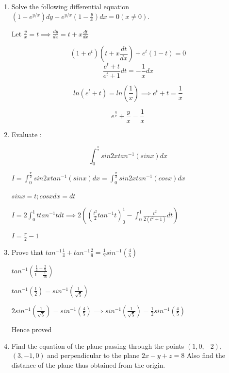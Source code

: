 \begin{enumerate}[label=\thesubsection.\arabic*, ref=\thesubsection.\theenumi]
mean $\mu= E(x) =\Sigma X,P(X)$

$E(x)= (0* \frac{25}{26})+(1*\frac{5}{18})+(2*\frac{1}{36})$

$$E(x)=\frac{1}{3}$$

\item 

Solve the following differential equation \newline $(1+e^{y/x})dy+e^{y/x}(1-\frac{y}{x})dx=0(x\ne0).$

\solution

Let $\frac{y}{x} =t \implies \frac{dy}{dx} =t + x\frac{dt}{dx} $

$$(1+e^t)(t+x\frac{dt}{dx})+ e^t(1-t) =0$$  $$\frac{e^t +t}{e^t+1}dt=-\frac{1}{x}dx$$

$$ln(e^t + t)=ln(\frac{1}{x}) \implies e^t + t= \frac{1}{x} $$

$$e^{\frac{y}{x}} + \frac{y}{x} = \frac{1}{x}$$

\item 

Evaluate : 

$$ \int_0^\frac{\pi}{2}sin2xtan^{-1}(sinx)dx$$

\solution

$I=\int_0^\frac{\pi}{2} sin2xtan^{-1}(sinx)dx=\int_0^\frac{\pi}{2}sin2xtan^{-1}(cosx)dx$

$sinx=t; cosxdx=dt$

$I=2\int_0^1ttan^{-1}tdt \implies  2\left(\left(\frac{t^2}{2}tan^{-1}t\right)_0^1-\int _0^1 \frac{t^2}{2(t^2+1)}dt\right)$

$I =\frac{\pi}{2}-1$

\item 

Prove that $tan^{-1}\frac{1}{4}+tan^{-1}\frac{2}{9}=\frac{1}{2}sin^{-1}(\frac{4}{5})$

\solution

$tan^{-1}\left(\frac{\frac{1}{4} +\frac{2}{9}}{1-\frac{1}{18}}\right)$

$tan^{-1}(\frac{1}{2})=sin^{-1}(\frac{1}{\sqrt{5}})$

$2sin^{-1}(\frac{1}{\sqrt{5}})= sin^{-1}(\frac{4}{5}) \implies sin^{-1}(\frac{1}{\sqrt{5}})=\frac{1}{2}sin^{-1}(\frac{4}{5})$

Hence proved 

\item 

Find the equation of the plane passing through the points $(1,0,-2)$, $(3,-1,0)$ and perpendicular to the plane $2x-y+z=8$ Also find the distance of the plane thus obtained from the origin.  


\end{enumerate}
